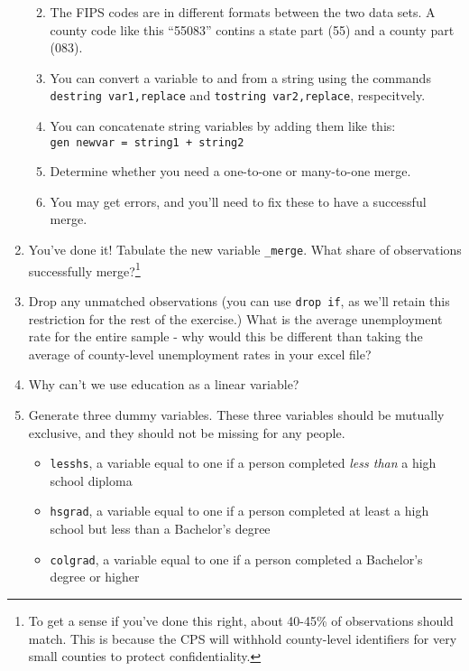\documentclass[
]{article}
\begin{document}
\begin{enumerate}
  \begin{enumerate}
  \def\labelenumii{\arabic{enumii}.}
  \item
    The FIPS codes are in different formats between the two data sets. A
    county code like this ``55083'' contins a state part (55) and a
    county part (083).
  \item
    You can convert a variable to and from a string using the commands
    \texttt{destring\ var1,replace} and \texttt{tostring\ var2,replace},
    respecitvely.
  \item
    You can concatenate string variables by adding them like this:
    \texttt{gen\ newvar\ =\ string1\ +\ string2}
  \item
    Determine whether you need a one-to-one or many-to-one merge.
  \item
    You may get errors, and you'll need to fix these to have a
    successful merge.
  \end{enumerate}
\item
  You've done it! Tabulate the new variable \texttt{\_merge}. What share
  of observations successfully merge?\footnote{To get a sense if you've
    done this right, about 40-45\% of observations should match. This is
    because the CPS will withhold county-level identifiers for very
    small counties to protect confidentiality.}
\item
  Drop any unmatched observations (you can use \texttt{drop\ if}, as
  we'll retain this restriction for the rest of the exercise.) What is
  the average unemployment rate for the entire sample - why would this
  be different than taking the average of county-level unemployment
  rates in your excel file?
\item
  Why can't we use education as a linear variable?
\item
  Generate three dummy variables. These three variables should be
  mutually exclusive, and they should not be missing for any people.

  \begin{itemize}
  \item
    \texttt{lesshs}, a variable equal to one if a person completed
    \emph{less than} a high school diploma
  \item
    \texttt{hsgrad}, a variable equal to one if a person completed at
    least a high school but less than a Bachelor's degree
  \item
    \texttt{colgrad}, a variable equal to one if a person completed a
    Bachelor's degree or higher
  \end{itemize}


\end{enumerate}
\end{document}

